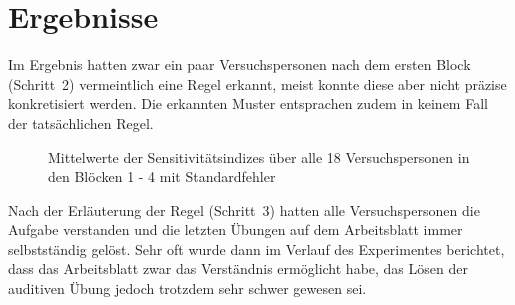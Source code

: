 \documentclass[doc,a4paper,12pt]{apa6}
\begin{document}
\section{Ergebnisse}

Im Ergebnis hatten zwar ein paar Versuchspersonen nach dem ersten Block (Schritt~2) vermeintlich eine Regel erkannt, meist konnte diese aber nicht präzise konkretisiert werden. Die erkannten Muster entsprachen zudem in keinem Fall der tatsächlichen Regel.

\begin{figure}[b]
  \centering
  \begin{minipage}{\textwidth}
    \vspace{10pt}
    \caption{Mittelwerte der Sensitivitätsindizes über alle 18 Versuchspersonen in den Blöcken 1 - 4 mit Standardfehler}
    \label{dprime}
  \end{minipage}
\end{figure}

Nach der Erläuterung der Regel (Schritt~3) hatten alle Versuchspersonen die Aufgabe verstanden und die letzten Übungen auf dem Arbeitsblatt immer selbstständig gelöst. Sehr oft wurde dann im Verlauf des Experimentes berichtet, dass das Arbeitsblatt zwar das Verständnis ermöglicht habe, das Lösen der auditiven Übung jedoch trotzdem sehr schwer gewesen sei.
\end{document}
